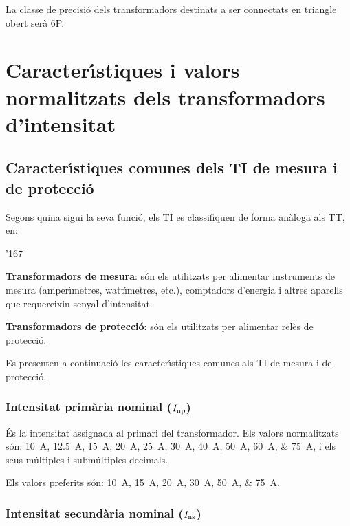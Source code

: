 La classe de precisi\'{o} dels transformadors destinats a ser connectats en triangle obert ser\`{a} 6P.

\section{Caracter\'{\i}stiques i valors normalitzats dels transformadors d'intensitat}

\subsection{Caracter\'{\i}stiques comunes dels TI de mesura i de protecci\'{o}}

Segons quina sigui la seva funci\'{o}, els TI es classifiquen de forma
an\`{a}loga als TT, en:
\begin{dinglist}{'167}
   \item \textbf{Transformadors de mesura}: s\'{o}n els utilitzats per alimentar
            instruments de mesura (amper\'{\i}metres, watt\'{\i}metres, etc.),
            comptadors d'energia i altres aparells que requereixin senyal d'intensitat.
   \item \textbf{Transformadors de protecci\'{o}}: s\'{o}n els utilitzats per
   alimentar rel\`{e}s de protecci\'{o}.
\end{dinglist}

Es presenten a continuaci\'{o} les caracter\'{\i}stiques comunes als TI de
mesura i de protecci\'{o}.


\subsubsection{Intensitat prim\`{a}ria nominal ($I_\mathrm{np}$)}

 \'{E}s la intensitat assignada al
primari del transformador. Els valors normalitzats
s\'{o}n: \SIlist{10; 12,5; 15; 20; 25;30; 40; 50; 60;75}{A}, i els
seus m\'{u}ltiples i subm\'{u}ltiples decimals.

Els valors preferits s\'{o}n: \SIlist{10; 15; 20; 30; 50;75}{A}.


\subsubsection{Intensitat secund\`{a}ria nominal ($I_\mathrm{ns}$)}

